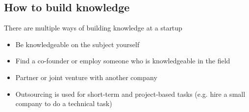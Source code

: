 \documentclass{article}
\begin{document}
  \subsection{How to build knowledge}
  There are multiple ways of building knowledge at a startup
  \begin{itemize}
    \item Be knowledgeable on the subject yourself
    \item Find a co-founder or employ someone who is knowledgeable in the field
    \item Partner or joint venture with another company
    \item Outsourcing is used for short-term and project-based tasks (e.g. hire a small company to do a technical task)
  \end{itemize}
\end{document}

